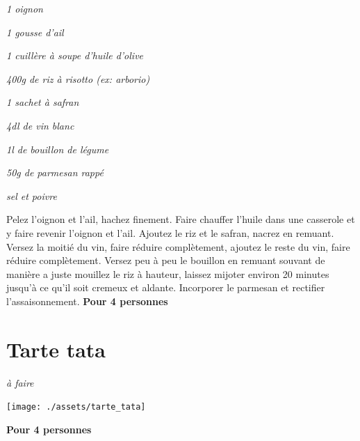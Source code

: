 \documentclass[10pt,a4paper]{report}
\begin{document}
    \begin{multicols}{2}
        \parbox[1cm]{\textwidth}{
            \begin{description}
                \item
                \textit{1 oignon}
                \item
                \textit{1 gousse d'ail}
                \item
                \textit{1 cuillère à soupe d'huile d'olive}
                \item
                \textit{400g de riz à risotto (ex: arborio)}
                \item
                \textit{1 sachet à safran}
                \item
                \textit{4dl de vin blanc}
                \item
                \textit{1l de bouillon de légume}
                \item
                \textit{50g de parmesan rappé}
                \item
                \textit{sel et poivre}
            \end{description}
        }
        \columnbreak
        \newline
        Pelez l'oignon et l'ail, hachez finement.
        \newline
        \newline
        Faire chauffer l'huile dans une casserole et y faire revenir l'oignon et l'ail. Ajoutez le riz et le safran, nacrez en remuant. Versez la moitié du vin, faire réduire complètement, ajoutez le reste du vin, faire réduire complètement. Versez peu à peu le bouillon en remuant souvant de manière a juste mouillez le riz à hauteur, laissez mijoter environ 20 minutes jusqu'à ce qu'il soit cremeux et aldante.
        \newline
        \newline
        Incorporer le parmesan et rectifier l'assaisonnement.
        \newline
        \newline
        \textbf{Pour 4 personnes}
    \end{multicols}
    \newpage

    \section{Tarte tata}

    \begin{multicols}{2}
        \parbox[1cm]{\textwidth}{
            \begin{description}
                \item \textit{à faire}
            \end{description}
        }
        \columnbreak
        \newline
        \centerline{\texttt{[image: ./assets/tarte\_tata]}}
        \newline
        \newline
        \textbf{Pour 4 personnes}
    \end{multicols}
    \newpage
\end{document}

